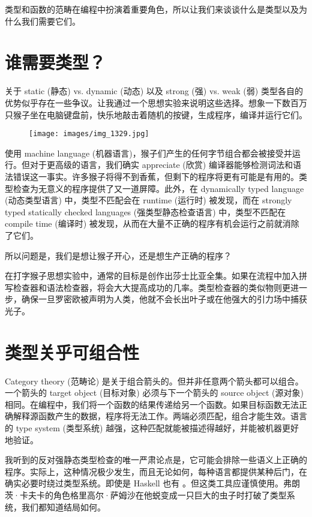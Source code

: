
\lettrine[lhang=0.17]{类}{型和函数的范畴}在编程中扮演着重要角色，所以让我们来谈谈什么是类型以及为什么我们需要它们。

\section{谁需要类型？}

关于 static (静态) vs. dynamic (动态) 以及 strong (强) vs. weak (弱) 类型各自的优势似乎存在一些争议。让我通过一个思想实验来说明这些选择。想象一下数百万只猴子坐在电脑键盘前，快乐地敲击着随机的按键，生成程序，编译并运行它们。

\begin{figure}[H]
  \centering
  \texttt{[image: images/img\_1329.jpg]}
\end{figure}

\noindent
使用 machine language (机器语言)，猴子们产生的任何字节组合都会被接受并运行。但对于更高级的语言，我们确实 appreciate (欣赏) 编译器能够检测词法和语法错误这一事实。许多猴子将得不到香蕉，但剩下的程序将更有可能是有用的。类型检查为无意义的程序提供了又一道屏障。此外，在 dynamically typed language (动态类型语言) 中，类型不匹配会在 runtime (运行时) 被发现，而在 strongly typed statically checked languages (强类型静态检查语言) 中，类型不匹配在 compile time (编译时) 被发现，从而在大量不正确的程序有机会运行之前就消除了它们。

所以问题是，我们是想让猴子开心，还是想生产正确的程序？

在打字猴子思想实验中，通常的目标是创作出莎士比亚全集。如果在流程中加入拼写检查器和语法检查器，将会大大提高成功的几率。类型检查器的类似物则更进一步，确保一旦罗密欧被声明为人类，他就不会长出叶子或在他强大的引力场中捕获光子。

\section{类型关乎可组合性}

Category theory (范畴论) 是关于组合箭头的。但并非任意两个箭头都可以组合。一个箭头的 target object (目标对象) 必须与下一个箭头的 source object (源对象) 相同。在编程中，我们将一个函数的结果传递给另一个函数。如果目标函数无法正确解释源函数产生的数据，程序将无法工作。两端必须匹配，组合才能生效。语言的 type system (类型系统) 越强，这种匹配就能被描述得越好，并能被机器更好地验证。

我听到的反对强静态类型检查的唯一严肃论点是，它可能会排除一些语义上正确的程序。实际上，这种情况极少发生，而且无论如何，每种语言都提供某种后门，在确实必要时绕过类型系统。即使是 Haskell 也有 。但这类工具应谨慎使用。弗朗茨·卡夫卡的角色格里高尔·萨姆沙在他蜕变成一只巨大的虫子时打破了类型系统，我们都知道结局如何。


